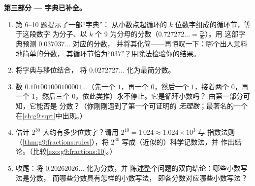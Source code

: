\begin{problem}
\medskip
\noindent\textbf{第三部分 --- 字典已补全。}
\begin{enumerate}[resume]
  \item 第 6--10 题提示了一部“字典”：
        从小数点起循环的 $k$ 位数字组成的循环节，等于这段数字
        为分子、以 $k$ 个 9 为分母的分数（$0.727272\ldots = \frac{72}{99}$）。用
        这部字典预测 $0.037037\ldots$ 对应的分数，
        并将其化简——再惊叹一下：哪个出人意料地简单的分数，
        其循环节恰为“$037$”？用除法检验你的结果。
  \item 将字典与移位结合，
        将 $0.0272727\ldots$ 化为最简分数。
  \item 数 $0.101001000100001\ldots$（先一个 $1$，再一个
        $0$，然后一个 $1$，接着两个 $0$，再一个 $1$，然后三个
        $0$，依此类推）永不停止。它是循环小数吗？
        由第一部分可知，它能否是
        分数？（你刚刚遇到了第一个可证明的
        \emph{无理数}；最著名的一个
        在\cref{ch:g9:sqrt}中出现。）
  \item 估计 $2^{30}$ 大约有多少位数字？请用
        $2^{10} = 1\,024 \approx 1.024 \times 10^3$ 与
        指数法则（\cref{thm:g9:fractions:rules}），将
        $2^{30}$ 写成（近似的）科学记数法，并
        作出结论。（比较\cref{exo:g9:fractions:10}。）
  \item 收尾：将 $0.20262026\ldots$ 化为分数，并
        陈述整个问题的双向结论：哪些小数写法是分数，
        而哪些分数具有怎样的小数写法，
        即各分数对应哪些小数写法？
\end{enumerate}
\end{problem}
